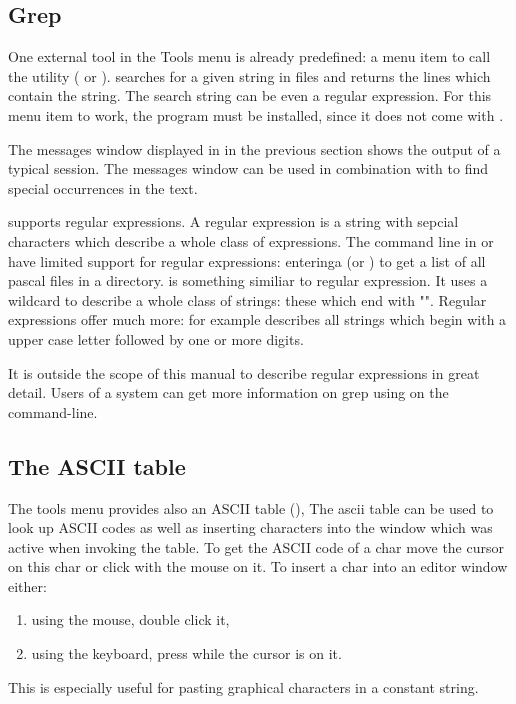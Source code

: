 \subsection{Grep}
\label{se:grep}
One external tool in the Tools menu is already predefined: a
menu item to call the  utility ( or
).  searches for a given string in files and
returns the lines which contain the string. The search string can
be even a regular expression. For this menu item to work, the
 program must be installed, since it does not come with \fpc.

The messages window displayed in  in the previous 
section shows the output of a typical  session. The messages
window can be used in combination with  to find special
occurrences in the text.

 supports regular expressions. A regular expression is a 
string with sepcial characters which describe a whole class of 
expressions. The command line in \dos or \linux have limited 
support for regular expressions: enteringa  
(or ) to get a list of all pascal files in a
directory.  is something similiar to regular expression. 
It uses a wildcard to describe a whole class of strings: these which 
end with "". 
Regular expressions offer much more: for example \var{[A-Z][0-9]+} 
describes all strings which begin with a upper case letter followed by
one or more digits.

It is outside the scope of this manual to describe regular expressions
in great detail. Users of a \linux system can get more information on grep
using  on the command-line.
%
%
\subsection{The ASCII table}
\label{se:asciitable}
The tools menu provides also an ASCII table (),
The ascii table can be used to look up ASCII codes as well as
inserting characters into the window which was active when invoking the
table. To get the ASCII code of a char move the cursor on this char 
or click with the mouse on it. To insert a
char into an editor window either:
\begin{enumerate}
\item using the mouse, double click it,
\item using the keyboard,  press  while the cursor is on it.
\end{enumerate}
This is especially useful for pasting graphical characters in a constant
string.


